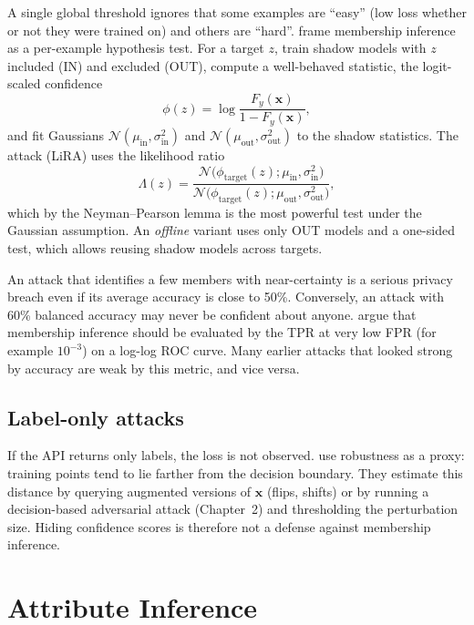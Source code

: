 \documentclass[10pt,a4paper]{extarticle}
\theoremstyle{definition}
\newcommand{\x}{\mathbf{x}}
\begin{document}
A single global threshold ignores that some examples are \enquote{easy} (low loss whether or not they were trained on) and others are \enquote{hard}. \citet{carlini2022membership} frame membership inference as a per-example hypothesis test. For a target \(z\), train shadow models with \(z\) included (IN) and excluded (OUT), compute a well-behaved statistic, the logit-scaled confidence
\[
\phi(z) = \log\frac{F_y(\x)}{1-F_y(\x)},
\]
and fit Gaussians \(\mathcal{N}(\mu_{\text{in}},\sigma^2_{\text{in}})\) and \(\mathcal{N}(\mu_{\text{out}},\sigma^2_{\text{out}})\) to the shadow statistics. The attack (LiRA) uses the likelihood ratio
\begin{equation}\label{eq:lira}
\Lambda(z) = \frac{\mathcal{N}\big(\phi_{\text{target}}(z);\mu_{\text{in}},\sigma^2_{\text{in}}\big)}{\mathcal{N}\big(\phi_{\text{target}}(z);\mu_{\text{out}},\sigma^2_{\text{out}}\big)},
\end{equation}
which by the Neyman--Pearson lemma is the most powerful test under the Gaussian assumption. An \emph{offline} variant uses only OUT models and a one-sided test, which allows reusing shadow models across targets.

\begin{warnbox}
An attack that identifies a few members with near-certainty is a serious privacy breach even if its average accuracy is close to 50\%. Conversely, an attack with 60\% balanced accuracy may never be confident about anyone. \citet{carlini2022membership} argue that membership inference should be evaluated by the TPR at very low FPR (for example \(10^{-3}\)) on a log-log ROC curve. Many earlier attacks that looked strong by accuracy are weak by this metric, and vice versa.
\end{warnbox}

\subsection{Label-only attacks}

If the API returns only labels, the loss is not observed. \citet{choquette2021label} use robustness as a proxy: training points tend to lie farther from the decision boundary. They estimate this distance by querying augmented versions of \(\x\) (flips, shifts) or by running a decision-based adversarial attack (Chapter~2) and thresholding the perturbation size. Hiding confidence scores is therefore not a defense against membership inference.

\section{Attribute Inference}
\end{document}
